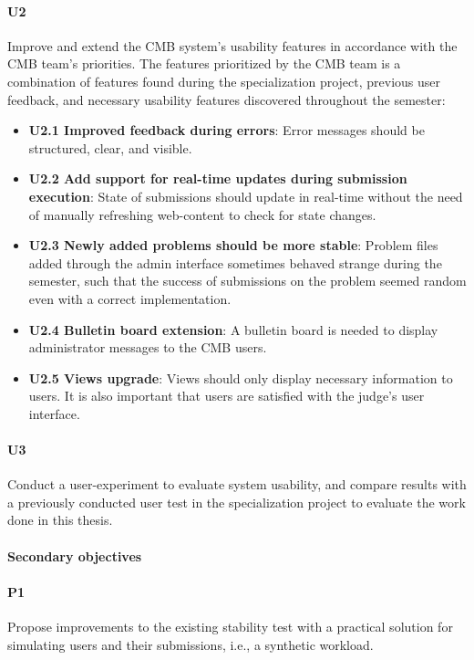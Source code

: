 \paragraph*{U2} Improve and extend the CMB system's usability features in accordance with the CMB team's priorities. The features prioritized by the CMB team is a combination of features found during the specialization project, previous user feedback, and necessary usability features discovered throughout the semester:
  \begin{itemize}
    \item \textbf{U2.1 Improved feedback during errors}: Error messages should be structured, clear, and visible.
    \item \textbf{U2.2 Add support for real-time updates during submission execution}: State of submissions should update in real-time without the need of manually refreshing web-content to check for state changes.
    \item \textbf{U2.3 Newly added problems should be more stable}: Problem files added through the admin interface sometimes behaved strange during the semester, such that the success of submissions on the problem seemed random even with a correct implementation.
    \item \textbf{U2.4 Bulletin board extension}: A bulletin board is needed to display administrator messages to the CMB users.
    \item \textbf{U2.5 Views upgrade}: Views should only display necessary information to users. It is also important that users are satisfied with the judge's user interface.
  \end{itemize}

\paragraph*{U3} Conduct a user-experiment to evaluate system usability, and compare results with a previously conducted user test in the specialization project to evaluate the work done in this thesis.

\paragraph*{Secondary objectives} \hfill

\paragraph*{P1} Propose improvements to the existing stability test with a practical solution for simulating users and their submissions, i.e., a synthetic workload.

